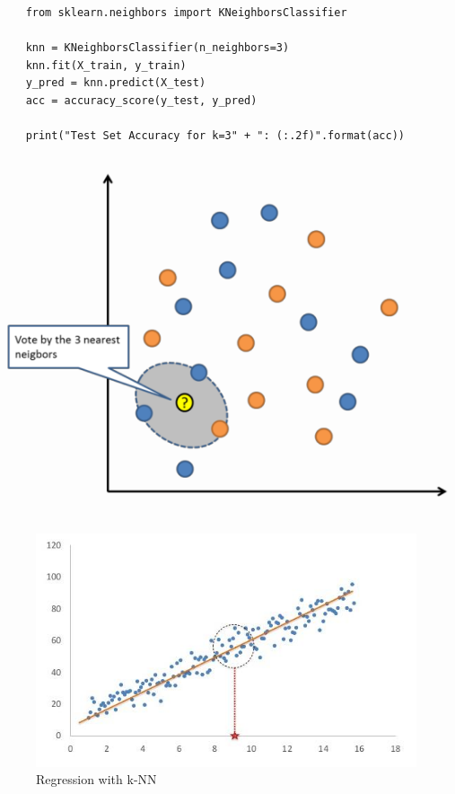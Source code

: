 \documentclass[a4paper, 11pt]{article}
\begin{document}
\begin{minipage}{0.55\textwidth}
    \begin{lstlisting}
    from sklearn.neighbors import KNeighborsClassifier

    knn = KNeighborsClassifier(n_neighbors=3)
    knn.fit(X_train, y_train)
    y_pred = knn.predict(X_test)
    acc = accuracy_score(y_test, y_pred)

    print("Test Set Accuracy for k=3" + ": (:.2f)".format(acc))
    \end{lstlisting}
\end{minipage}\hfill
\begin{minipage}{0.40\textwidth}
    \centering
    \includegraphics[keepaspectratio=true, width=\textwidth]{knn.png}
\end{minipage}    

\vspace{10px}

\begin{figure}
    \centering
    \includegraphics[keepaspectratio=true,height=12\baselineskip]{k-nn-regression.jpg}
    \caption{Regression with k-NN}
    \label{fig:knn-regression}
\end{figure}
\end{document}

